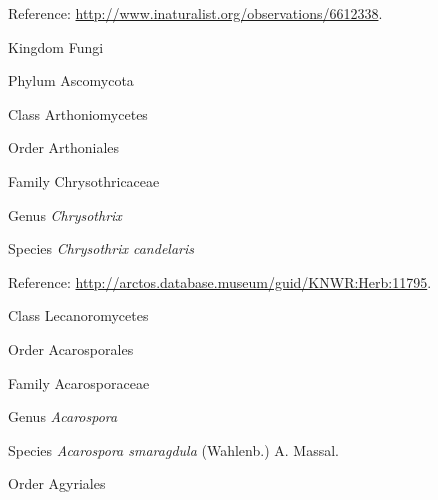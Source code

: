 \documentclass[9pt, article]{memoir}
\begin{document}
\begin{multicols}{2}
\vspace{6pt}Reference: 
\url{http://www.inaturalist.org/observations/6612338}.

\vspace{6pt}\noindent\hspace{0pt}Kingdom Fungi


\vspace{6pt}\noindent\hspace{6pt}Phylum Ascomycota


\vspace{6pt}\noindent\hspace{12pt}Class Arthoniomycetes


\vspace{6pt}\noindent\hspace{18pt}Order Arthoniales


\vspace{6pt}\noindent\hspace{24pt}Family Chrysothricaceae


\vspace{6pt}\noindent\hspace{30pt}Genus \textit{Chrysothrix}


\vspace{6pt}\noindent\hspace{36pt}Species \textit{Chrysothrix candelaris}


\vspace{6pt}Reference: 
\url{http://arctos.database.museum/guid/KNWR:Herb:11795}.

\vspace{6pt}\noindent\hspace{12pt}Class Lecanoromycetes


\vspace{6pt}\noindent\hspace{18pt}Order Acarosporales


\vspace{6pt}\noindent\hspace{24pt}Family Acarosporaceae


\vspace{6pt}\noindent\hspace{30pt}Genus \textit{Acarospora}


\vspace{6pt}\noindent\hspace{36pt}Species \textit{Acarospora smaragdula} (Wahlenb.) A. Massal.


\vspace{6pt}\noindent\hspace{18pt}Order Agyriales



\end{multicols}
\end{document}
